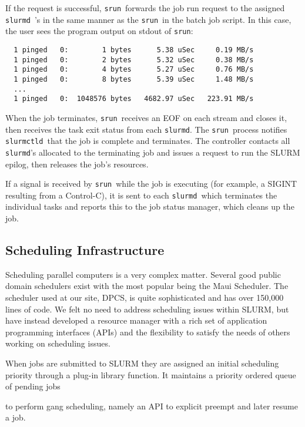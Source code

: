 \documentclass{article}
\newcommand{\srun}{{\tt srun}}
\newcommand{\slurmctld}{{\tt slurmctld}}
\newcommand{\slurmd}{{\tt slurmd}}
\begin{document}
If the request is successful, \srun\ forwards the job run request
to the assigned \slurmd~'s in the same manner as the \srun\ in the
batch job script. In this case, the user sees the program output on 
stdout of {\tt srun}:

\begin{verbatim}
  1 pinged   0:        1 bytes      5.38 uSec     0.19 MB/s                     
  1 pinged   0:        2 bytes      5.32 uSec     0.38 MB/s                     
  1 pinged   0:        4 bytes      5.27 uSec     0.76 MB/s                     
  1 pinged   0:        8 bytes      5.39 uSec     1.48 MB/s                     
  ...
  1 pinged   0:  1048576 bytes   4682.97 uSec   223.91 MB/s              
\end{verbatim}

When the job terminates, \srun\ receives an EOF on each stream and
closes it, then receives the task exit status from each {\tt slurmd}.
The \srun\ process notifies \slurmctld\ that the job is complete 
and terminates. The controller contacts all \slurmd 's allocated to the
terminating job and issues a request to run the SLURM epilog, then releases
the job's resources.

If a signal is received by \srun\ while the job is executing (for example,
a SIGINT resulting from a Control-C), it is sent to each \slurmd\ which 
terminates the individual tasks and reports this to the job status manager,
which cleans up the job.

\subsection{Scheduling Infrastructure}

Scheduling parallel computers is a very complex matter.  
Several good public domain schedulers exist with the most 
popular being the Maui Scheduler\cite{Jackson2001,Maui2002}. 
The scheduler used at our site, DPCS\cite{DPCS2002}, is quite 
sophisticated and has over 150,000 lines of code. 
We felt no need to address scheduling issues within SLURM, but 
have instead developed a resource manager with a rich set of 
application programming interfaces (APIs) and the flexibility 
to satisfy the needs of others working on scheduling issues.  

When jobs are submitted to SLURM they are assigned an initial 
scheduling priority through a plug-in library function. It 
maintains a priority ordered queue of pending jobs

to perform gang scheduling, namely an API 
to explicit preempt and later resume a job.
\end{document}
